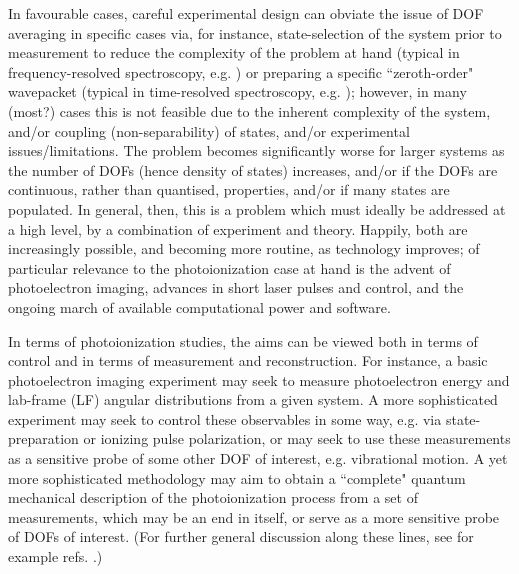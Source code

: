 In favourable cases, careful experimental design can obviate the issue of DOF averaging in specific cases via, for instance, state-selection of the system prior to measurement to reduce the complexity of the problem at hand (typical in frequency-resolved spectroscopy, e.g. \cite{bunkerMolSymm, herzberg1945molecular, hollasHighRes}) or preparing a specific ``zeroth-order" wavepacket (typical in time-resolved spectroscopy, e.g. \cite{Tannor2007,Stolow2008,wu2011TimeresolvedPhotoelectronSpectroscopy}); however, in many (most?) cases this is not feasible due to the inherent complexity of the system, and/or coupling (non-separability) of states, and/or experimental issues/limitations. The problem becomes significantly worse for larger systems as the number of DOFs (hence density of states) increases, and/or if the DOFs are continuous, rather than quantised, properties, and/or if many states are populated. In general, then, this is a problem which must ideally be addressed at a high level, by a combination of experiment and theory. Happily, both are increasingly possible, and becoming more routine, as technology improves; of particular relevance to the photoionization case at hand is the advent of photoelectron imaging, advances in short laser pulses and control, and the ongoing march of available computational power and software.

In terms of photoionization studies, the aims can be viewed both in terms of control and in terms of measurement and reconstruction. For instance, a basic photoelectron imaging experiment may seek to measure photoelectron energy and lab-frame (LF) angular distributions from a given system. A more sophisticated experiment may seek to control these observables in some way, e.g. via state-preparation or ionizing pulse polarization, or may seek to use these measurements as a sensitive probe of some other DOF of interest, e.g. vibrational motion. A yet more sophisticated methodology may aim to obtain a ``complete" quantum mechanical description of the photoionization process from a set of measurements, which may be an end in itself, or serve as a more sensitive probe of DOFs of interest. (For further general discussion along these lines, see for example refs. \cite{hockett2018QMP1, kleinpoppen2013perfect, Reid2012, Stolow2008}.)